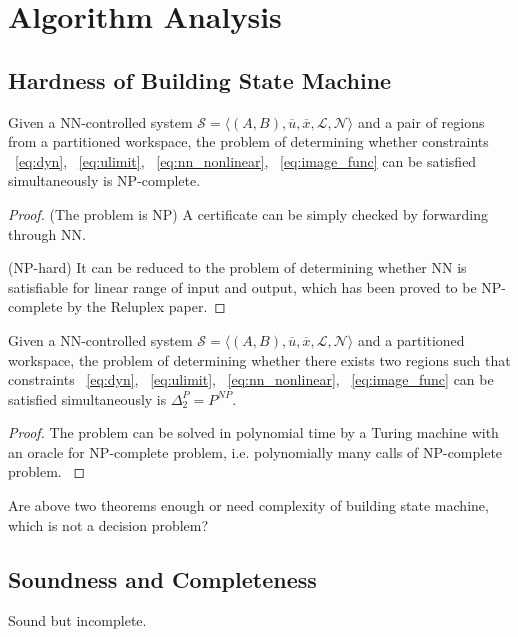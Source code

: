\section{Algorithm Analysis}

\subsection{Hardness of Building State Machine}

\begin{theorem}
    Given a NN-controlled system 
    $\mathcal{S} = \langle (A, B), \overline{u}, \overline{x}, \mathcal{L}, \mathcal{N} \rangle$ 
    and a pair of regions from a partitioned workspace, 
    the problem of determining whether constraints
    ~\eqref{eq:dyn}, ~\eqref{eq:ulimit}, ~\eqref{eq:nn_nonlinear}, ~\eqref{eq:image_func}
    can be satisfied simultaneously is NP-complete.
\end{theorem}    

\begin{proof}
    {\color{blue} 
    (The problem is NP) A certificate can be simply checked by forwarding through NN.

    (NP-hard) It can be reduced to the problem of determining whether NN is satisfiable for linear range of input and output, 
    which has been proved to be NP-complete by the Reluplex paper.
    }
\end{proof}


\begin{theorem}
    Given a NN-controlled system 
    $\mathcal{S} = \langle (A, B), \overline{u}, \overline{x}, \mathcal{L}, \mathcal{N} \rangle$ 
    and a partitioned workspace,
    the problem of determining whether there exists two regions such that constraints
    ~\eqref{eq:dyn}, ~\eqref{eq:ulimit}, ~\eqref{eq:nn_nonlinear}, ~\eqref{eq:image_func}
    can be satisfied simultaneously is $\Delta_2^P = P^{NP}$.
\end{theorem}    

\begin{proof}
    {\color{blue} 
    The problem can be solved in polynomial time by a Turing machine with an oracle for NP-complete problem, 
    i.e. polynomially many calls of NP-complete problem.
    }
\end{proof}    



{\color{blue} Are above two theorems enough or need complexity of building state machine, which is not a decision problem?}


\subsection{Soundness and Completeness}
{\color{blue} Sound but incomplete.}

